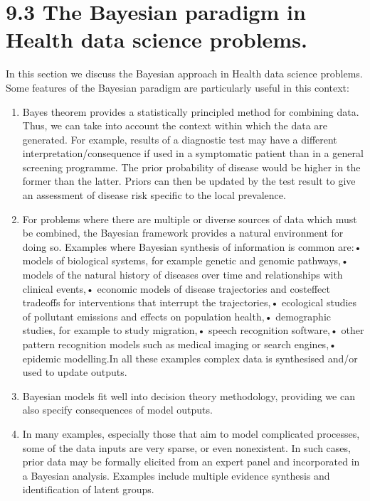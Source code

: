 \documentclass[letterpaper,10pt,english]{jupyterBook}
\begin{document}
\section{9.3 The Bayesian paradigm in Health data science problems.}
\label{\detokenize{09.d. Bayesian Statistics I:the-bayesian-paradigm-in-health-data-science-problems}}\label{\detokenize{09.d. Bayesian Statistics I::doc}}
\sphinxAtStartPar
In this section we discuss the Bayesian approach in Health data science problems. Some features of the Bayesian paradigm are particularly useful in this context:
\begin{enumerate}
%
\item {} 
\sphinxAtStartPar
Bayes theorem provides a statistically principled method for combining data. Thus, we can take into account the context within which the data are generated. For example, results of a diagnostic test may have a different interpretation/consequence if used in a symptomatic patient than in a general screening programme. The prior probability of disease would be higher in the former than the latter. Priors can then be updated by the test result to give an assessment of disease risk specific to the local prevalence.

\item {} 
\sphinxAtStartPar
For problems where there are multiple or diverse sources of data which must be combined, the Bayesian framework provides a natural environment for doing so. Examples where Bayesian synthesis of information is common are:•	models of biological systems, for example genetic and genomic pathways,•	models of the natural history of diseases over time and relationships with clinical events,•	economic models of disease trajectories and cost\sphinxhyphen{}effect trade\sphinxhyphen{}offs for interventions that interrupt the trajectories,•	ecological studies of pollutant emissions and effects on population health,•	demographic studies, for example to study migration,•	speech recognition software,•	other pattern recognition models such as medical imaging or search engines,•	epidemic modelling.In all these examples complex data is synthesised and/or used to update outputs.

\item {} 
\sphinxAtStartPar
Bayesian models fit well into decision theory methodology, providing we can also specify consequences of model outputs.

\item {} 
\sphinxAtStartPar
In many examples, especially those that aim to model complicated processes, some of the data inputs are very sparse, or even non\sphinxhyphen{}existent. In such cases, prior data may be formally elicited from an expert panel and incorporated in a Bayesian analysis. Examples include multiple evidence synthesis and identification of latent groups.


\end{enumerate}
\end{document}
